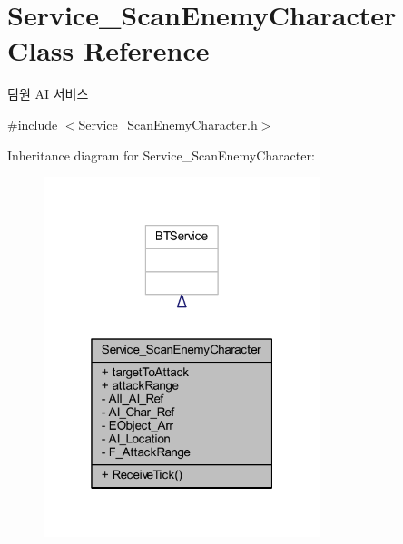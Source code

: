 \hypertarget{class_service___scan_enemy_character}{}\section{Service\+\_\+\+Scan\+Enemy\+Character Class Reference}
\label{class_service___scan_enemy_character}


팀원 AI 서비스  




{\ttfamily \#include $<$Service\+\_\+\+Scan\+Enemy\+Character.\+h$>$}



Inheritance diagram for Service\+\_\+\+Scan\+Enemy\+Character\+:\nopagebreak
\begin{figure}[H]
\begin{center}
\leavevmode
\includegraphics[width=229pt]{class_service___scan_enemy_character__inherit__graph}
\end{center}
\end{figure}


